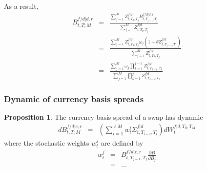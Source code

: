 \documentclass[11pt,english]{amsart}
\newcommand{\f}{\ell}
\theoremstyle{definition}
\newtheorem{prop}{Proposition}
\begin{document}
As a result,
\begin{eqnarray*}
	B^{f/d|d,r}_{t,T;M}  
	&=& \frac{ \sum_{j=1}^{M}   Z^{f|d}_{t,T_0,T_j} B^{f/d|d,r}_{t,T_{j-1},T_j} }{\sum_{j=1}^{M}  Z^{f|d}_{t,T_0,T_j}} \\
	&=& \frac{ \sum_{j=1}^{M}   Z^{f|d}_{t,T_0,T_j} \omega_j \left(1+\theta Z^{f|d}_{t,T_{j-1},T_j}\right) }{\sum_{j=1}^{M}  Z^{f|d}_{t,T_0,T_j}} \\
	&=& \frac{ \sum_{j=1}^{M} \omega_j \prod_{k=1}^{j-1} Z^{f|d}_{t,T_{k-1},T_{k}} } {  \sum_{j=1}^{M}  \prod_{k=1}^{j} Z^{f|d}_{t,T_{k-1},T_{k}}  }
\end{eqnarray*}




\subsubsection{Dynamic of currency basis spreads}


\begin{prop}
The currency basis spread of a swap has dynamic
\begin{eqnarray}
	dB^{f/d|c,r}_{t,T;M}  & = &  \left( \sum_{i=1}^{\f M} w^i_t \Sigma^{f|d}_{t,T_{i-1},T_i} \right)  dW^{f|d,T_0,T_M}_t
\end{eqnarray} 
where the stochastic weights $w^j_t$ are defined by
\begin{eqnarray}
	w^j_t &=& B^{f/d|c,r}_{t,T_{j-1},T_j} \frac{\partial B}{\partial B_j} \\
	&=&  \ldots 
\end{eqnarray} 
\end{prop}
\end{document}
